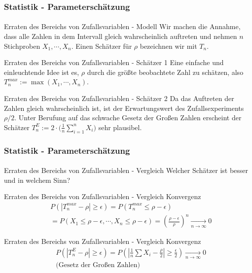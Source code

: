 \documentclass{beamer}
\begin{document}
\begin{frame}
    \frametitle{Statistik - Parameterschätzung}
\framesubtitle{}

\begin{block}{Erraten des Bereichs von Zufallsvariablen - Modell}
 Wir machen die Annahme, dass alle Zahlen in dem Intervall gleich wahrscheinlich auftreten und  nehmen $n$ Stichproben $X_1, \cdots, X_n$.
Einen Schätzer für $\rho$ bezeichnen wir mit $T_n$.
\end{block}

\begin{block}{Erraten des Bereichs von Zufallsvariablen - Schätzer 1}
Eine einfache und einleuchtende Idee ist es, $\rho$ durch die größte beobachtete Zahl zu schätzen, also
$T_n^{max} := \max(X_1, \cdots, X_n)$.
 \end{block}

\begin{block}{Erraten des Bereichs von Zufallsvariablen - Schätzer 2}
Da das Auftreten der Zahlen gleich wahrscheinlich ist, ist der Erwartungswert des Zufallsexperiments $\rho /2$. Unter Berufung auf das  schwache Gesetz der Großen Zahlen erscheint der Schätzer
$T_n^{E} :=  2 \cdot \biggl( \frac{1}{n} \sum_{i=1}^n X_i \biggr)$ sehr plausibel.
 \end{block}

 \end{frame}




\begin{frame}
    \frametitle{Statistik - Parameterschätzung}
\framesubtitle{}

\begin{block}{Erraten des Bereichs von Zufallsvariablen - Vergleich}
Welcher Schätzer ist besser und in welchem Sinn?
\end{block}

\begin{block}{Erraten des Bereichs von Zufallsvariablen - Vergleich Konvergenz}
\begin{align*}
& P(| T_n^{max} - \rho | \geq \epsilon)   = P(T_n^{max} \leq \rho - \epsilon)   \\
& = P(X_1  \leq \rho - \epsilon, \cdots,  X_n \leq \rho - \epsilon )  = (\frac{\rho - \epsilon}{\rho})^n \underset{n \to \infty}{\longrightarrow} 0
\end{align*}
\end{block}


\begin{block}{Erraten des Bereichs von Zufallsvariablen - Vergleich Konvergenz}
\begin{align*}
& P(| T_n^{E} - \rho | \geq \epsilon)   = P(| \frac{1}{n} \sum X_i  - \frac{\rho}{2} | \geq \frac{\epsilon}{2})  \underset{n \to \infty}{\longrightarrow} 0 \\
 & \text{(Gesetz der Großen Zahlen)}
\end{align*}
\end{block}

 \end{frame}
\end{document}
